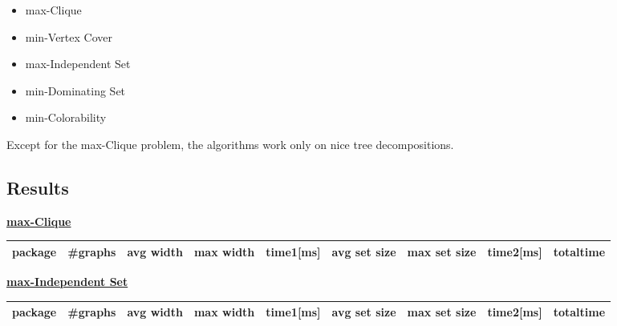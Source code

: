 \documentclass[a4wide]{article}
\begin{document}
\begin{itemize}
\item max-Clique
\item min-Vertex Cover
\item max-Independent Set
\item min-Dominating Set
\item min-Colorability
\end{itemize}

Except for the max-Clique problem, the algorithms work only on nice tree decompositions. 

\begin{comment}


max-Clique is computed by solving max-Clique on the by bags induced subgraphs of the input graph for all bags of the tree decomposition. The answer is the maximum size of a clique, that has been computed in this way. This is the case, because clique must be fully contained in some bag of a tree decomposition. The algorithm works in time $\mathcal{|V(G)| \cdot 2^{\operatorname{tw}(G)+1}}$. If the input graph has small treewidth, e.g. k is a small constant, the algorithms work in linear time. 

\end{comment}


\subsection{Results}

\underline{\textbf{max-Clique}} \\
\begin{tabular}{|l|l|l|l|l|l|l|l|l|}
\hline
package & \#graphs & avg width & max width & time1[ms] & avg set size & max set size & time2[ms] & totaltime \\
\hline
\hline

\hline
\end{tabular}

\vspace*{5mm}

\underline{\textbf{max-Independent Set}} \\
\begin{tabular}{|l|l|l|l|l|l|l|l|l|}
\hline
package & \#graphs & avg width & max width & time1[ms] & avg set size & max set size & time2[ms] & totaltime \\
\hline
\hline

\hline
\end{tabular}
\end{document}
